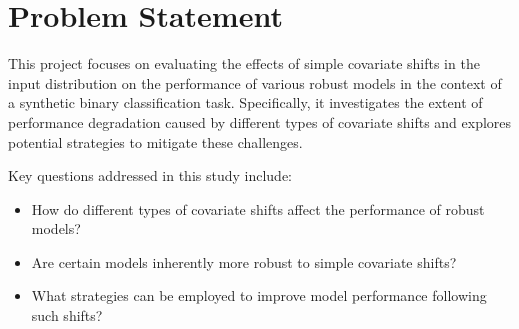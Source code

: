 \chapter*{Problem Statement}

\label{sec:problem_statement}
This project focuses on evaluating the effects of simple covariate shifts in the input distribution on the performance of various robust models in the context of a synthetic binary classification task. Specifically, it investigates the extent of performance degradation caused by different types of covariate shifts and explores potential strategies to mitigate these challenges.

Key questions addressed in this study include:
\begin{itemize}
    \item How do different types of covariate shifts affect the performance of robust models?
    \item Are certain models inherently more robust to simple covariate shifts?
    \item What strategies can be employed to improve model performance following such shifts?
\end{itemize}
